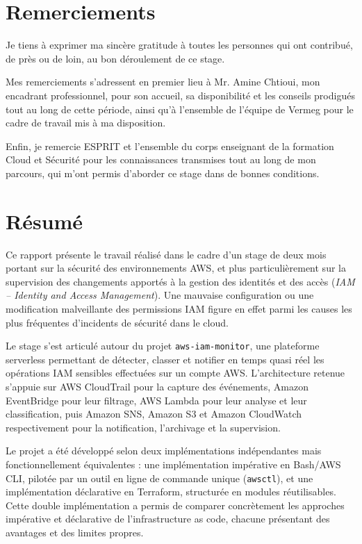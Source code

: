 \documentclass[11pt,a4paper]{report}
\begin{document}

\chapter*{Remerciements}

Je tiens à exprimer ma sincère gratitude à toutes les personnes qui ont contribué, de près ou de loin, au bon déroulement de ce stage.

Mes remerciements s'adressent en premier lieu à Mr. Amine Chtioui, mon encadrant professionnel, pour son accueil, sa disponibilité et les conseils prodigués tout au long de cette période, ainsi qu'à l'ensemble de l'équipe de Vermeg pour le cadre de travail mis à ma disposition.

Enfin, je remercie ESPRIT et l'ensemble du corps enseignant de la formation Cloud et Sécurité pour les connaissances transmises tout au long de mon parcours, qui m'ont permis d'aborder ce stage dans de bonnes conditions.

\chapter*{Résumé}

Ce rapport présente le travail réalisé dans le cadre d'un stage de deux mois portant sur la sécurité des environnements AWS, et plus particulièrement sur la supervision des changements apportés à la gestion des identités et des accès (\textit{IAM -- Identity and Access Management}). Une mauvaise configuration ou une modification malveillante des permissions IAM figure en effet parmi les causes les plus fréquentes d'incidents de sécurité dans le cloud.

Le stage s'est articulé autour du projet \texttt{aws-iam-monitor}, une plateforme serverless permettant de détecter, classer et notifier en temps quasi réel les opérations IAM sensibles effectuées sur un compte AWS. L'architecture retenue s'appuie sur AWS CloudTrail pour la capture des événements, Amazon EventBridge pour leur filtrage, AWS Lambda pour leur analyse et leur classification, puis Amazon SNS, Amazon S3 et Amazon CloudWatch respectivement pour la notification, l'archivage et la supervision.

Le projet a été développé selon deux implémentations indépendantes mais fonctionnellement équivalentes : une implémentation impérative en Bash/AWS CLI, pilotée par un outil en ligne de commande unique (\texttt{awsctl}), et une implémentation déclarative en Terraform, structurée en modules réutilisables. Cette double implémentation a permis de comparer concrètement les approches impérative et déclarative de l'infrastructure as code, chacune présentant des avantages et des limites propres.
\end{document}
